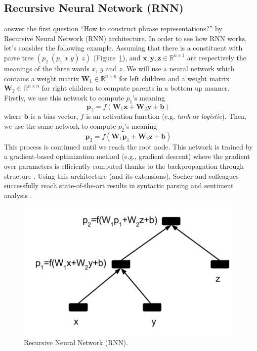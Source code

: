 \documentclass[11pt]{article}
\begin{document}
\subsection{Recursive Neural Network (RNN)}
\label{subsection rnn}
 answer the first question ``How to construct phrase representations?'' 
by Recursive Neural Network (RNN) architecture. 
In order to see how RNN works, 
let's consider the following example. Assuming that there is a constituent with parse
tree $(p_2 \; (p_1 \; x \; y) \; z)$ (Figure~\ref{figure rnn}), and $\mathbf{x},\mathbf{y},\mathbf{z} \in \mathbb{R}^{n \times 1}$
are respectively the meanings of the three words $x$, $y$ and $z$. 
We will use a neural network 
which contains a weight matrix $\mathbf{W}_1  \in \mathbb{R}^{n \times n}$ for left children and 
a weight matrix $\mathbf{W}_2  \in \mathbb{R}^{n \times n}$ for right children 
to compute parents in a bottom up manner. Firstly, we use this network 
to compute $p_1$'s meaning
\begin{equation}
	\mathbf{p}_1 = f(\mathbf{W}_1 \mathbf{x} + \mathbf{W}_2 \mathbf{y} + \mathbf{b})
\end{equation}
where $\mathbf{b}$ is a bias vector, $f$ is an activation function (e.g. \textit{tanh} or \textit{logistic}).
Then, we use the same network to compute $p_2$'s meaning
\begin{equation}
	\mathbf{p}_2 = f(\mathbf{W}_1 \mathbf{p}_1 + \mathbf{W}_2 \mathbf{z} + \mathbf{b})
\end{equation}
This process is continued until we reach the root node.  This network is trained by 
a gradient-based optimization method (e.g., gradient descent) where the gradient 
over parameters is efficiently computed thanks to the backpropagation through structure
\cite{goller_learning_1996}. Using this architecture 
(and its extensions), Socher and colleagues successfully reach 
state-of-the-art results in syntactic parsing \cite{socher2013parsing} and 
sentiment analysis \cite{socher2013recursive}. 
\begin{figure}[h!]
	\center
	\includegraphics[scale=0.5]{RNN.png}
	\caption{Recursive Neural Network (RNN).}
	\label{figure rnn}
\end{figure}
\end{document}
